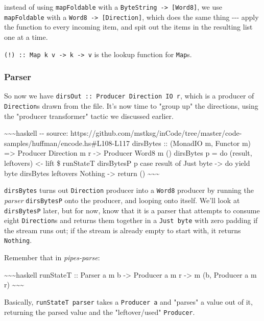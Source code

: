 \documentclass[]{article}
\begin{document}
instead of using \texttt{mapFoldable} with a
\texttt{ByteString\ -\textgreater{}\ {[}Word8{]}}, we use \texttt{mapFoldable}
with a \texttt{Word8\ -\textgreater{}\ {[}Direction{]}}, which does the same
thing -\/-\/- apply the function to every incoming item, and spit out the items
in the resulting list one at a time.

\texttt{(!)\ ::\ Map\ k\ v\ -\textgreater{}\ k\ -\textgreater{}\ v} is the
lookup function for \texttt{Map}s.

\subsubsection{Parser}

So now we have \texttt{dirsOut\ ::\ Producer\ Direction\ IO\ r}, which is a
producer of \texttt{Direction}s drawn from the file. It's now time to "group up"
the directions, using the "producer transformer" tactic we discussed earlier.

\textasciitilde{}\textasciitilde{}\textasciitilde{}haskell -\/- source:
https://github.com/mstksg/inCode/tree/master/code-samples/huffman/encode.hs\#L108-L117
dirsBytes :: (MonadIO m, Functor m) =\textgreater{} Producer Direction m r
-\textgreater{} Producer Word8 m () dirsBytes p = do (result, leftovers)
\textless{}- lift \$ runStateT dirsBytesP p case result of Just byte
-\textgreater{} do yield byte dirsBytes leftovers Nothing -\textgreater{} return
() \textasciitilde{}\textasciitilde{}\textasciitilde{}

\texttt{dirsBytes} turns out \texttt{Direction} producer into a \texttt{Word8}
producer by running the \emph{parser} \texttt{dirsBytesP} onto the producer, and
looping onto itself. We'll look at \texttt{dirsBytesP} later, but for now, know
that it is a parser that attempts to consume eight \texttt{Direction}s and
returns them together in a \texttt{Just\ byte} with zero padding if the stream
runs out; if the stream is already empty to start with, it returns
\texttt{Nothing}.

Remember that in \emph{pipes-parse}:

\textasciitilde{}\textasciitilde{}\textasciitilde{}haskell runStateT :: Parser a
m b -\textgreater{} Producer a m r -\textgreater{} m (b, Producer a m r)
\textasciitilde{}\textasciitilde{}\textasciitilde{}

Basically, \texttt{runStateT\ parser} takes a \texttt{Producer\ a} and "parses"
a value out of it, returning the parsed value and the "leftover/used"
\texttt{Producer}.
\end{document}
